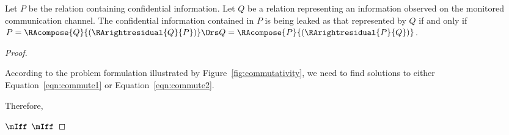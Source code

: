 \begin{corollary}
\label{cor:test}
	Let $P$ be the relation containing confidential information. Let $Q$ be a relation representing an information observed on the monitored communication channel. The confidential information contained in $P$ is being leaked as that represented by $Q$ if and only if $P = \RAcompose{Q}{(\RArightresidual{Q}{P})} \Ors Q = \RAcompose{P}{(\RArightresidual{P}{Q})}$. 
	
\begin{proof}~
	
	According to the problem formulation illustrated by Figure~\ref{fig:commutativity}, we need to find solutions to either Equation~\ref{eqn:commute1} or Equation~\ref{eqn:commute2}. \newline
	
	Therefore,
	
	\Beginproof 
		$\mIff$ 
		$\mIff$ 
	\Endproof
	
\end{proof}

\end{corollary}